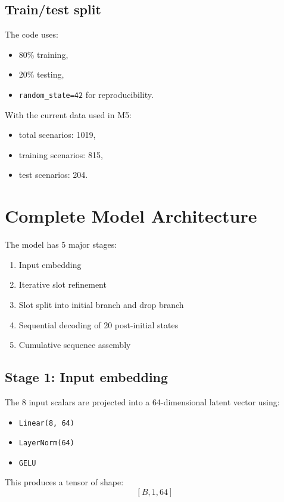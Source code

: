 \documentclass[11pt,a4paper]{article}
\begin{document}
\subsection*{Train/test split}
The code uses:
\begin{itemize}[nosep]
    \item 80\% training,
    \item 20\% testing,
    \item \texttt{random\_state=42} for reproducibility.
\end{itemize}

With the current data used in M5:
\begin{itemize}[nosep]
    \item total scenarios: 1019,
    \item training scenarios: 815,
    \item test scenarios: 204.
\end{itemize}

\section{Complete Model Architecture}

The model has 5 major stages:

\begin{enumerate}[nosep]
    \item Input embedding
    \item Iterative slot refinement
    \item Slot split into initial branch and drop branch
    \item Sequential decoding of 20 post-initial states
    \item Cumulative sequence assembly
\end{enumerate}

\subsection*{Stage 1: Input embedding}
The 8 input scalars are projected into a 64-dimensional latent vector using:
\begin{itemize}[nosep]
    \item \texttt{Linear(8, 64)}
    \item \texttt{LayerNorm(64)}
    \item \texttt{GELU}
\end{itemize}

This produces a tensor of shape:
$$
[B, 1, 64]
$$
\end{document}
